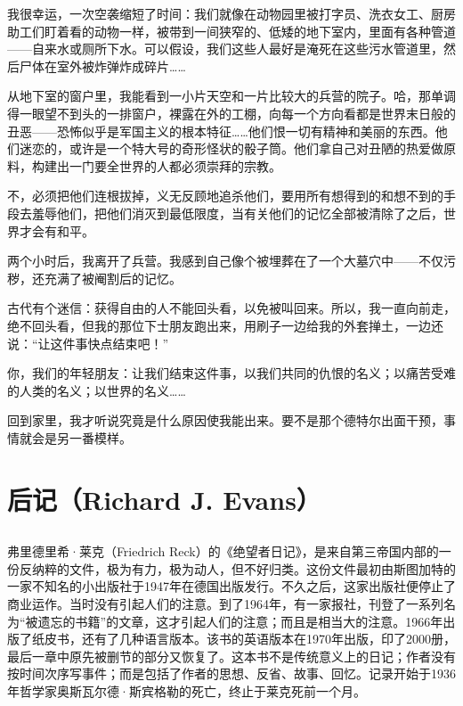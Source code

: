\documentclass[UTF8]{ctexart}
\begin{document}
我很幸运，一次空袭缩短了时间：我们就像在动物园里被打字员、洗衣女工、厨房助工们盯着看的动物一样，被带到一间狭窄的、低矮的地下室内，里面有各种管道——自来水或厕所下水。可以假设，我们这些人最好是淹死在这些污水管道里，然后尸体在室外被炸弹炸成碎片……

从地下室的窗户里，我能看到一小片天空和一片比较大的兵营的院子。哈，那单调得一眼望不到头的一排窗户，裸露在外的工棚，向每一个方向看都是世界末日般的丑恶——恐怖似乎是军国主义的根本特征……他们恨一切有精神和美丽的东西。他们迷恋的，或许是一个特大号的奇形怪状的骰子筒。他们拿自己对丑陋的热爱做原料，构建出一门要全世界的人都必须崇拜的宗教。

不，必须把他们连根拔掉，义无反顾地追杀他们，要用所有想得到的和想不到的手段去羞辱他们，把他们消灭到最低限度，当有关他们的记忆全部被清除了之后，世界才会有和平。

两个小时后，我离开了兵营。我感到自己像个被埋葬在了一个大墓穴中——不仅污秽，还充满了被阉割后的记忆。

古代有个迷信：获得自由的人不能回头看，以免被叫回来。所以，我一直向前走，绝不回头看，但我的那位下士朋友跑出来，用刷子一边给我的外套掸土，一边还说：“让这件事快点结束吧！”

你，我们的年轻朋友：让我们结束这件事，以我们共同的仇恨的名义；以痛苦受难的人类的名义；以世界的名义……

回到家里，我才听说究竟是什么原因使我能出来。要不是那个德特尔出面干预，事情就会是另一番模样。

\section{后记（Richard J. Evans）}

\subsection{}

弗里德里希·莱克（Friedrich Reck）的《绝望者日记》，是来自第三帝国内部的一份反纳粹的文件，极为有力，极为动人，但不好归类。这份文件最初由斯图加特的一家不知名的小出版社于1947年在德国出版发行。不久之后，这家出版社便停止了商业运作。当时没有引起人们的注意。到了1964年，有一家报社，刊登了一系列名为“被遗忘的书籍”的文章，这才引起人们的注意；而且是相当大的注意。1966年出版了纸皮书，还有了几种语言版本。该书的英语版本在1970年出版，印了2000册，最后一章中原先被删节的部分又恢复了。这本书不是传统意义上的日记；作者没有按时间次序写事件；而是包括了作者的思想、反省、故事、回忆。记录开始于1936年哲学家奥斯瓦尔德·斯宾格勒的死亡，终止于莱克死前一个月。
\end{document}
